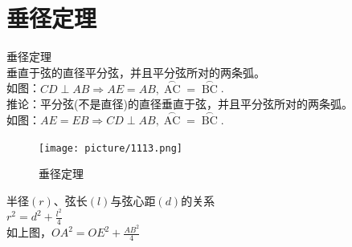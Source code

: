 \documentclass{ecnuthesis}
\begin{document}
\section{垂径定理}
\begin{knowledge}
    垂径定理 \\
    垂直于弦的直径平分弦，并且平分弦所对的两条弧。\\
    如图：$CD\perp AB \Rightarrow AE=AB,\mathop{AC}\limits^{\frown}=\mathop{BC}\limits^{\frown}$. \\
    推论：平分弦(不是直径)的直径垂直于弦，并且平分弦所对的两条弧。\\
    如图：$AE=EB \Rightarrow CD\perp AB,\mathop{AC}\limits^{\frown}=\mathop{BC}\limits^{\frown}$.
\end{knowledge}
\begin{figure}[H]
\centering
\texttt{[image: picture/1113.png]}
\caption{垂径定理}
\end{figure}
\begin{knowledge}
    半径$(r)$、弦长$(l)$与弦心距$(d)$的关系 \\
    $r^2=d^2+\frac{l^2}{4}$ \\
    如上图，$OA^2=OE^2+\frac{AB^2}{4}$
\end{knowledge}
\clearpage
\end{document}
